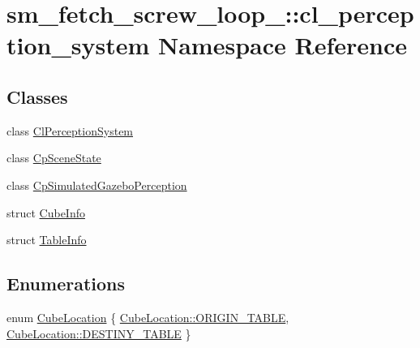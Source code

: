 \hypertarget{namespacesm__fetch__screw__loop__1_1_1cl__perception__system}{}\section{sm\+\_\+fetch\+\_\+screw\+\_\+loop\+\_\+:\+:cl\+\_\+perception\+\_\+system Namespace Reference}
\label{namespacesm__fetch__screw__loop__1_1_1cl__perception__system}
\subsection*{Classes}
\begin{DoxyCompactItemize}
\item 
class \hyperlink{classsm__fetch__screw__loop__1_1_1cl__perception__system_1_1ClPerceptionSystem}{Cl\+Perception\+System}
\item 
class \hyperlink{classsm__fetch__screw__loop__1_1_1cl__perception__system_1_1CpSceneState}{Cp\+Scene\+State}
\item 
class \hyperlink{classsm__fetch__screw__loop__1_1_1cl__perception__system_1_1CpSimulatedGazeboPerception}{Cp\+Simulated\+Gazebo\+Perception}
\item 
struct \hyperlink{structsm__fetch__screw__loop__1_1_1cl__perception__system_1_1CubeInfo}{Cube\+Info}
\item 
struct \hyperlink{structsm__fetch__screw__loop__1_1_1cl__perception__system_1_1TableInfo}{Table\+Info}
\end{DoxyCompactItemize}
\subsection*{Enumerations}
\begin{DoxyCompactItemize}
\item 
enum \hyperlink{namespacesm__fetch__screw__loop__1_1_1cl__perception__system_a8cdb75a4100a10a4a1c6034d9655088d}{Cube\+Location} \{ \hyperlink{namespacesm__fetch__screw__loop__1_1_1cl__perception__system_a8cdb75a4100a10a4a1c6034d9655088dae5ee34c3ef8ec4a46a00a218416c7b1d}{Cube\+Location\+::\+O\+R\+I\+G\+I\+N\+\_\+\+T\+A\+B\+LE}, 
\hyperlink{namespacesm__fetch__screw__loop__1_1_1cl__perception__system_a8cdb75a4100a10a4a1c6034d9655088dacdc3fdda18904b4a1ac0be036c86f973}{Cube\+Location\+::\+D\+E\+S\+T\+I\+N\+Y\+\_\+\+T\+A\+B\+LE}
 \}
\end{DoxyCompactItemize}


